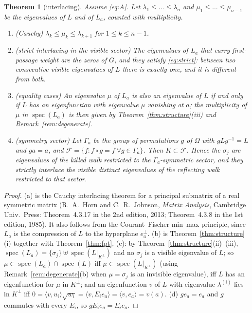 \documentclass[11pt,a4paper]{article}
\DeclareMathOperator{\spec}{spec}
\newcommand{\ip}[2]{\langle #1,#2\rangle}
\theoremstyle{plain}
\newtheorem{theorem}{Theorem}[section]
\theoremstyle{definition}
\numberwithin{equation}{section}
\begin{document}
\begin{theorem}[interlacing]\label{thm:interlace}
Assume \eqref{eq:A}. Let $\lambda_1\le\dots\le\lambda_n$ and $\mu_1\le\dots\le\mu_{n-1}$ be the eigenvalues of $L$ and of $L_a$, counted with multiplicity.
\begin{enumerate}
\item[(a)] (Cauchy) $\lambda_k\le\mu_k\le\lambda_{k+1}$ for $1\le k\le n-1$.
\item[(b)] (strict interlacing in the visible sector) The eigenvalues of $L_a$ that carry first-passage weight are the zeros of $G$, and they satisfy \eqref{eq:strict}: between two consecutive \emph{visible} eigenvalues of $L$ there is exactly one, and it is different from both.
\item[(c)] (equality cases) An eigenvalue $\mu$ of $L_a$ is also an eigenvalue of $L$ if and only if $L$ has an eigenfunction with eigenvalue $\mu$ vanishing at $a$; the multiplicity of $\mu$ in $\spec(L_a)$ is then given by Theorem~\ref{thm:structure}(iii) and Remark~\ref{rem:degenerate}.
\item[(d)] (symmetry sector) Let $\Gamma_a$ be the group of permutations $g$ of $\Omega$ with $gLg^{-1}=L$ and $ga=a$, and $\mathcal F=\{f: f\circ g=f\ \forall g\in\Gamma_a\}$. Then $K\subset\mathcal F$. Hence the $\sigma_j$ are eigenvalues of the killed walk restricted to the $\Gamma_a$-symmetric sector, and they strictly interlace the visible distinct eigenvalues of the reflecting walk restricted to that sector.
\end{enumerate}
\end{theorem}
\begin{proof}
(a) is the Cauchy interlacing theorem for a principal submatrix of a real symmetric matrix (R.~A.~Horn and C.~R.~Johnson, \emph{Matrix Analysis}, Cambridge Univ.\ Press: Theorem~4.3.17 in the 2nd edition, 2013; Theorem~4.3.8 in the 1st edition, 1985). It also follows from the Courant--Fischer min--max principle, since $L_a$ is the compression of $L$ to the hyperplane $e_a^\perp$. (b) is Theorem~\ref{thm:structure}(i) together with Theorem~\ref{thm:fpt}. (c): by Theorem~\ref{thm:structure}(ii)--(iii), $\spec(L_a)=\{\sigma_j\}\uplus\spec(L|_{K^\perp})$ and no $\sigma_j$ is a visible eigenvalue of $L$; so $\mu\in\spec(L_a)\cap\spec(L)$ iff $\mu\in\spec(L|_{K^\perp})$ (using Remark~\ref{rem:degenerate}(b) when $\mu=\sigma_j$ is an invisible eigenvalue), iff $L$ has an eigenfunction for $\mu$ in $K^\perp$; and an eigenfunction $v$ of $L$ with eigenvalue $\lambda^{(i)}$ lies in $K^\perp$ iff $0=\ip v{u_i}\sqrt{w_i}=\ip v{E_ie_a}=\ip{v}{e_a}=v(a)$. (d) $ge_a=e_a$ and $g$ commutes with every $E_i$, so $gE_ie_a=E_ie_a$.
\end{proof}
\end{document}
